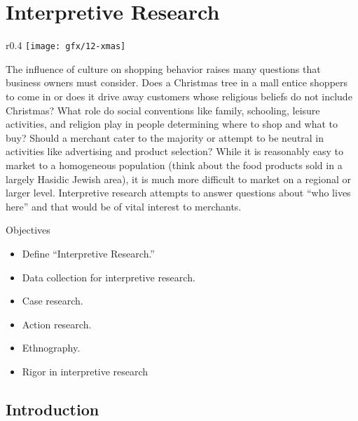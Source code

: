 \chapter{Interpretive Research}\label{ch13:interpretive_research}

\begin{wrapfigure}{r}{0.4\textwidth}
	\centering
	\texttt{[image: gfx/12-xmas]} 
\end{wrapfigure}

The influence of culture on shopping behavior raises many questions that business owners must consider. Does a Christmas tree in a mall entice shoppers to come in or does it drive away customers whose religious beliefs do not include Christmas? What role do social conventions like family, schooling, leisure activities, and religion play in people determining where to shop and what to buy? Should a merchant cater to the majority or attempt to be neutral in activities like advertising and product selection? While it is reasonably easy to market to a homogeneous population (think about the food products sold in a largely Hasidic Jewish area), it is much more difficult to market on a regional or larger level. Interpretive research attempts to answer questions about ``who lives here'' and that would be of vital interest to merchants.

\begin{center}
	\begin{objbox}{Objectives}
		\begin{itemize}
			\setlength{\itemsep}{0pt}
			\setlength{\parskip}{0pt}
			\setlength{\parsep}{0pt}
			
			\item Define ``Interpretive Research.''
			\item Data collection for interpretive research.
			\item Case research.
			\item Action research.
			\item Ethnography.
			\item Rigor in interpretive research
		\end{itemize}
	\end{objbox}
\end{center}


\section{Introduction}

